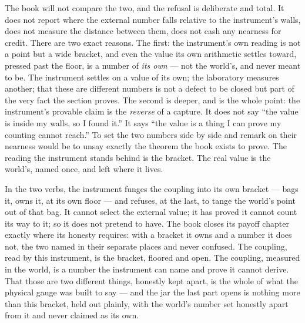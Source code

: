 The book will not compare the two, and the refusal is deliberate and total. It does not report where the external number
falls relative to the instrument's walls, does not measure the distance between them, does not cash any nearness for credit.
There are two exact reasons. The first: the instrument's own reading is not a point but a wide bracket, and even the value
its own arithmetic settles toward, pressed past the floor, is a number of \emph{its own} --- not the world's, and never meant
to be. The instrument settles on a value of its own; the laboratory measures another; that these are different numbers is not
a defect to be closed but part of the very fact the section proves. The second is deeper, and is the
whole point: the instrument's provable claim is the \emph{reverse} of a capture. It does not say ``the value is inside my
walls, so I found it.'' It says ``the value is a thing I can prove my counting cannot reach.'' To set the two numbers side by
side and remark on their nearness would be to unsay exactly the theorem the book exists to prove. The reading the instrument
stands behind is the bracket. The real value is the world's, named once, and left where it lives.

In the two verbs, the instrument funges the coupling into its own bracket --- bags it, owns it, at its own floor --- and
refuses, at the last, to tange the world's point out of that bag. It cannot select the external value; it has proved it
cannot count its way to it; so it does not pretend to have. The book closes its payoff chapter exactly where its honesty
requires: with a bracket it owns and a number it does not, the two named in their separate places and never confused. The
coupling, read by this instrument, is the bracket, floored and open. The coupling, measured in the world, is a number the
instrument can name and prove it cannot derive. That those are two different things, honestly kept apart, is the whole of
what the physical gauge was built to say --- and the jar the last part opens is nothing more than this bracket, held out
plainly, with the world's number set honestly apart from it and never claimed as its own.
